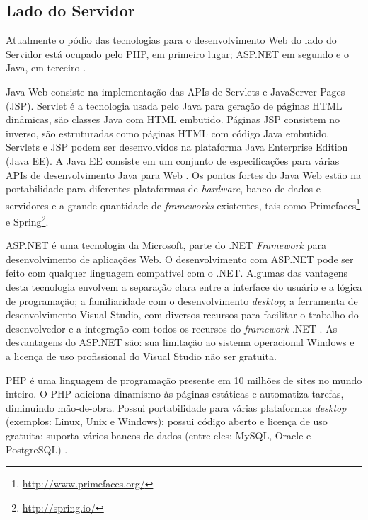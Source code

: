 \subsection{Lado do Servidor} \label{sec:server}
Atualmente o pódio das tecnologias para o desenvolvimento Web do lado do Servidor está ocupado pelo PHP, em primeiro lugar; ASP.NET em segundo e o Java, em terceiro \cite{w3techs2015}. \par

Java Web consiste na implementação das APIs de Servlets e JavaServer Pages (JSP). Servlet é a tecnologia usada pelo Java para geração de páginas HTML dinâmicas, são classes Java com HTML embutido. Páginas JSP consistem no inverso, são estruturadas como páginas HTML com código Java embutido. Servlets e JSP podem ser desenvolvidos na plataforma Java Enterprise Edition (Java EE). A Java EE consiste em um conjunto de especificações para várias APIs de desenvolvimento Java para Web \cite{basham2008}. Os pontos fortes do Java Web estão na portabilidade para diferentes plataformas de \textit{hardware}, banco de dados e servidores e a grande quantidade de \textit{frameworks} existentes, tais como Primefaces\footnote{\url{http://www.primefaces.org/}} e Spring\footnote{\url{http://spring.io/}}. \par

ASP.NET é uma tecnologia da Microsoft, parte do .NET \textit{Framework} para desenvolvimento de aplicações Web. O desenvolvimento com ASP.NET pode ser feito com qualquer linguagem compatível com o .NET. Algumas das vantagens desta tecnologia envolvem a separação clara entre a interface do usuário e a lógica de programação; a familiaridade com o desenvolvimento \textit{desktop}; a ferramenta de desenvolvimento Visual Studio, com diversos recursos para facilitar o trabalho do desenvolvedor e a integração com todos os recursos do \textit{framework} .NET \cite{imar2014}. As desvantagens do ASP.NET são: sua limitação ao sistema operacional Windows e a licença de uso profissional do Visual Studio não ser gratuita. \par

PHP é uma linguagem de programação presente em 10 milhões de sites no mundo inteiro. O PHP adiciona dinamismo às páginas estáticas e automatiza tarefas, diminuindo mão-de-obra. Possui portabilidade para várias plataformas \textit{desktop} (exemplos: Linux, Unix e Windows); possui código aberto e licença de uso gratuita; suporta vários bancos de dados (entre eles: MySQL, Oracle e PostgreSQL) \cite{niederauer2004, welling2003}. \par

